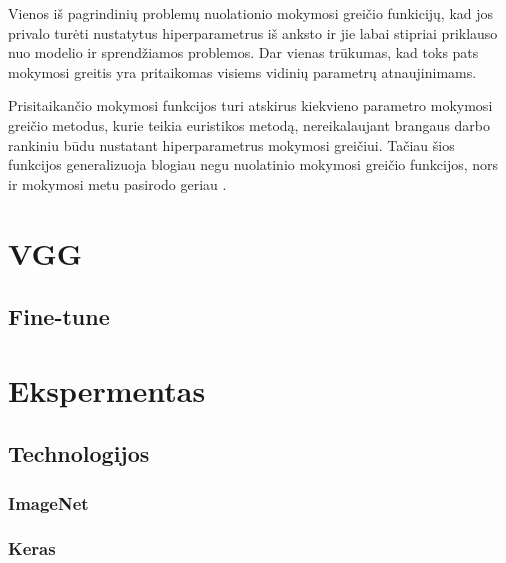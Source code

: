 \documentclass{VUMIFPSkursinis}
\begin{document}
Vienos iš pagrindinių problemų nuolationio mokymosi greičio funkicijų, kad jos privalo turėti nustatytus hiperparametrus 
iš anksto ir jie labai stipriai priklauso nuo modelio ir sprendžiamos problemos. Dar vienas trūkumas, kad toks pats 
mokymosi greitis yra pritaikomas visiems vidinių parametrų atnaujinimams.

Prisitaikančio mokymosi funkcijos turi atskirus kiekvieno parametro mokymosi greičio metodus, kurie teikia euristikos 
metodą, nereikalaujant brangaus darbo rankiniu būdu nustatant hiperparametrus mokymosi greičiui. Tačiau šios funkcijos 
generalizuoja blogiau negu nuolatinio mokymosi greičio funkcijos, nors ir mokymosi metu pasirodo geriau \cite{2017arXiv170508292W}.


\section{VGG}
\subsection{Fine-tune}

\section{Ekspermentas}
\subsection{Technologijos}
\subsubsection{ImageNet}
\subsubsection{Keras}



\printbibliography[heading=bibintoc]  %
\end{document}
